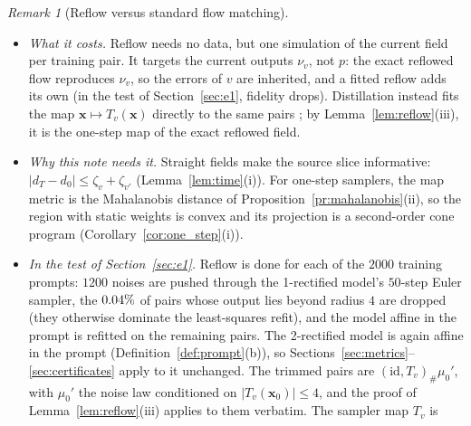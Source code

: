 \documentclass{article}
\DeclareMathOperator{\E}{\mathbb{E}}
\newcommand{\bx}{\mathbf{x}}
\theoremstyle{plain}
\theoremstyle{remark}
\newtheorem{remark}[theorem]{Remark}
\begin{document}
\begin{remark}[Reflow versus standard flow matching]
\begin{itemize}
training pairs. Third, a coupling is unchanged by this operation if and only if its segments do not cross, and
optimal transport couplings for strictly convex costs are such fixed points; in dimension one, flows cannot cross, so one
reflow of an exact flow gives a straight one. Fourth, among the first $k$ rectified flows, the smallest sum of straightness
defect and crossing is at most $\E\|\bx_1-\bx_0\|^2/k$ for the initial pairs. For $c=\|\cdot\|^2$, an exact identity underlies these results:
$\E\|\bx_1-\bx_0\|^2$ over the training pairs minus $\E\|Z_1-Z_0\|^2$ equals the crossing of the training pairs plus the curvature
$\int_0^1\E\|\dot Z_t-(Z_1-Z_0)\|^2dt$ of the learned flow. On the ring, with independent training pairs, $\E\|\bx_1-\bx_0\|^2$ falls from $\rfCostInd$ to
$\rfCostRefl$, a decrease of $\rfDecrease$, against a crossing of $\rfVind$ plus a curvature of $\rfCurv$, that is $\rfSum$; the gap is discretisation error.
\item \emph{What it costs.} Reflow needs no data, but one simulation of the current field per training pair. It targets
the current outputs $\nu_v$, not $p$: the exact reflowed flow reproduces $\nu_v$, so the errors of $v$ are inherited, and a fitted
reflow adds its own (in the test of Section~\ref{sec:e1}, fidelity drops).
Distillation instead fits the map $\bx\mapsto T_v(\bx)$ directly to the same pairs \citep{liu2024instaflow}; by Lemma~\ref{lem:reflow}(iii),
it is the one-step map of the exact reflowed field.
\item \emph{Why this note needs it.} Straight fields make the source slice informative: $|d_T-d_0|\le\zeta_v+\zeta_{v'}$
(Lemma~\ref{lem:time}(i)). For one-step samplers, the map metric is the Mahalanobis distance of Proposition~\ref{pr:mahalanobis}(ii), so
the region with static weights is convex and its projection is a second-order cone program (Corollary~\ref{cor:one_step}(i)).
\item \emph{In the test of Section~\ref{sec:e1}.} Reflow is done for each of the $2000$ training prompts: $1200$ noises are pushed
through the 1-rectified model's $50$-step Euler sampler, the $0.04\%$ of pairs whose output lies beyond radius $4$
are dropped (they otherwise dominate the least-squares refit), and the model affine in the prompt is refitted on
the remaining pairs. The 2-rectified model is again affine in the prompt (Definition~\ref{def:prompt}(b)), so
Sections~\ref{sec:metrics}--\ref{sec:certificates} apply to it unchanged. The trimmed pairs are $(\mathrm{id},T_v)_\#\mu_0'$, with $\mu_0'$ the noise
law conditioned on $|T_v(\bx_0)|\le4$, and the proof of Lemma~\ref{lem:reflow}(iii) applies to them verbatim. The sampler map $T_v$ is

\end{itemize}
\end{remark}
\end{document}
